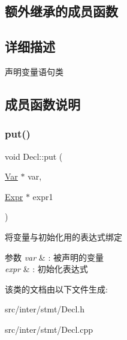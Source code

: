 \subsection*{额外继承的成员函数}


\subsection{详细描述}
声明变量语句类 

\subsection{成员函数说明}
\mbox{\label{class_decl_a4c91db9c289b90f3045783f6bf53a688}} 
\subsubsection{\texorpdfstring{put()}{put()}}
{\footnotesize\ttfamily void Decl\+::put (\begin{DoxyParamCaption}\item[{\hyperlink{class_var}{Var} $\ast$}]{var,  }\item[{\hyperlink{class_expr}{Expr} $\ast$}]{expr1 }\end{DoxyParamCaption})}

将变量与初始化用的表达式绑定 
\begin{DoxyParams}{参数}
{\em var} & \+: 被声明的变量 \\
\hline
{\em expr} & \+: 初始化表达式 \\
\hline
\end{DoxyParams}


该类的文档由以下文件生成\+:\begin{DoxyCompactItemize}
\item 
src/inter/stmt/Decl.\+h\item 
src/inter/stmt/Decl.\+cpp\end{DoxyCompactItemize}
